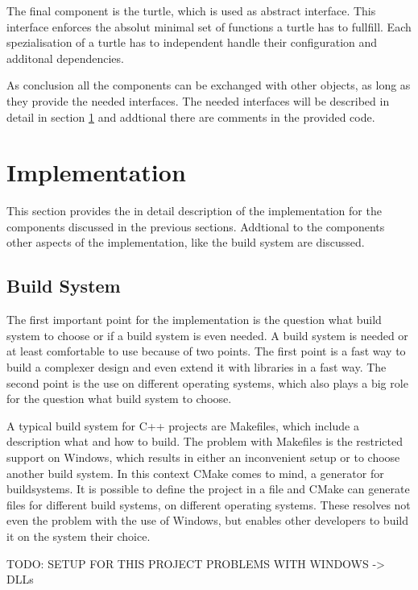 \documentclass[english]{cpp-hmwk}
\begin{document}
The final component is the turtle, which is used as abstract interface. This interface enforces the absolut minimal set of functions a turtle has to fullfill. Each spezialisation of a turtle has to independent handle their configuration and additonal dependencies.

As conclusion all the components can be exchanged with other objects, as long as they provide the needed interfaces. The needed interfaces will be described in detail in section \ref{section:impl} and addtional there are comments in the provided code.

\pagebreak

\section{Implementation}
\label{section:impl}
This section provides the in detail description of the implementation for the components discussed in the previous sections. Addtional to the components other aspects of the implementation, like the build system are discussed.

\subsection{Build System}
\label{section:buildsystem}
The first important point for the implementation is the question what build system to choose or if a build system is even needed. A build system is needed or at least comfortable to use  because of two points. The first point is a fast way to build a complexer design and even extend it with libraries in a fast way. The second point is the use on different operating systems, which also plays a big role for the question what build system to choose.
 
A typical build system for C++ projects are Makefiles, which include a description what and how to build. The problem with Makefiles is the restricted support on Windows, which results in either an inconvenient setup or to choose another build system.
In this context CMake comes to mind, a generator for buildsystems. It is possible to define the project in a file and CMake can generate files for different build systems, on different operating systems. These resolves not even the problem with the use of Windows, but enables other developers to build it on the system their choice.



TODO: SETUP FOR THIS PROJECT
PROBLEMS WITH WINDOWS -> DLLs
\end{document}
